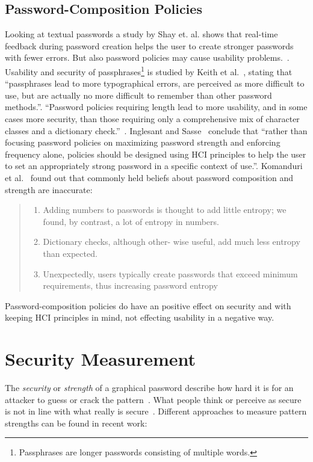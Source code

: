 \documentclass[twocolumn, a4paper, 10pt]{article}
\begin{document}
\subsection{Password-Composition Policies}
\label{sec:related:policies}
Looking at textual passwords a study by Shay et. al. shows that real-time feedback during password creation helps the user to create stronger passwords with fewer errors. But also password policies may cause usability problems.~\cite{Shay:2015:SSI:2702123.2702586}. Usability and security of passphrases\footnote{Passphrases are longer passwords consisting of multiple words.} is studied by Keith et al.~\cite{Keith200717}, stating that ``passphrases lead to more typographical errors, are perceived as more difficult to use, but are actually no more difficult to remember than other password methods.''. ``Password policies requiring length lead to more usability, and in some cases more security, than those requiring only a comprehensive mix of character classes and a dictionary check.''~\cite{Shay:2014:LPS:2556288.2557377}. Inglesant and Sasse~\cite{Inglesant:2010:TCU:1753326.1753384} conclude that ``rather than focusing password policies on maximizing password strength and enforcing frequency alone, policies should be designed using HCI principles to help the user to set an appropriately strong password in a specific context of use.''. Komanduri et al.~\cite{Komanduri:2011:PPM:1978942.1979321} found out that commonly held beliefs about password composition and strength are inaccurate:
\begin{quote}
	\small
	\begin{enumerate}
		\item Adding numbers to passwords is thought to add little entropy; we found, by contrast, a lot of entropy in numbers.
		\item Dictionary checks, although other- wise useful, add much less entropy than expected.
		\item Unexpectedly, users typically create passwords that exceed minimum requirements, thus increasing password entropy
	\end{enumerate}
\end{quote}

Password-composition policies do have an positive effect on security and with keeping HCI principles in mind, not effecting usability in a negative way.


\section{Security Measurement}
\label{sec:security}
The \emph{security} or \emph{strength} of a graphical password describe how hard it is for an attacker to guess or crack the pattern~\cite{Keith200717}. What people think or perceive as secure is not in line with what really is secure~\cite{Aviv:2014:UVP:2664243.2664253}. Different approaches to measure pattern strengths can be found in recent work:
\end{document}
